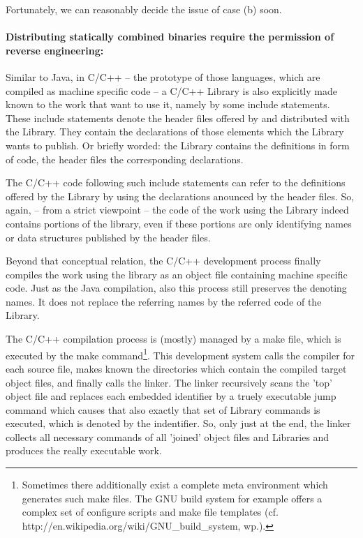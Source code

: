 Fortunately, we can reasonably decide the issue of case (b) soon.

\paragraph{Distributing statically combined binaries require the
permission of reverse engineering:}

Similar to Java, in C/C++ -- the prototype of those languages, which are
compiled as machine specific code -- a C/C++ Library is also explicitly made
known to the work that want to use it, namely by some include statements. These
include statements denote the header files offered by and distributed with the
Library. They contain the declarations of those elements which the Library wants
to publish. Or briefly worded: the Library contains the definitions in form of
code, the header files the corresponding declarations.

The C/C++ code following such include statements can refer to the definitions
offered by the Library by using the declarations anounced by the header files.
So, again, -- from a strict viewpoint -- the code of the work using the Library
indeed contains portions of the library, even if these portions are only
identifying names or data structures published by the header files.

Beyond that conceptual relation, the C/C++ development process finally compiles
the work using the library as an object file containing machine specific code.
Just as the Java compilation, also this process still preserves the denoting
names. It does not replace the referring names by the referred code of the
Library. 

The C/C++ compilation process is (mostly) managed by a make file, which is
executed by the make command\footnote{Sometimes there additionally exist a
complete meta environment which generates such make files. The GNU build system
for example offers a complex set of configure scripts and make file templates
(cf. http://en.wikipedia.org/wiki/GNU\_build\_system, wp.).}. This development
system calls the compiler for each source file, makes known the directories
which contain the compiled target object files, and finally calls the linker.
The linker recursively scans the 'top' object file and replaces each embedded
identifier by a truely executable jump command which causes that also exactly
that set of Library commands is executed, which is denoted by the indentifier.
So, only just at the end, the linker collects all necessary commands of all
'joined' object files and Libraries and produces the really executable work.

